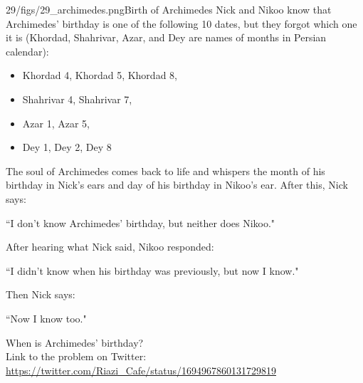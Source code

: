 \begin{problem}{29/figs/29_archimedes.png}{Birth of Archimedes}
	Nick and Nikoo know that Archimedes' birthday is one of the following 10 dates, but they forgot which one it is (Khordad, Shahrivar, Azar, and Dey are names of months in Persian calendar):

\begin{itemize}
\item  Khordad 4, Khordad 5, Khordad 8,
\item  Shahrivar 4, Shahrivar 7, 
\item Azar 1, Azar 5,
\item  Dey 1, Dey 2, Dey 8
\end{itemize}

The soul of Archimedes comes back to life and whispers the month of his birthday in Nick's ears and day of his birthday in Nikoo's ear. After this, Nick says: 
\begin{center}
``I don't know Archimedes' birthday, but neither does Nikoo."
\end{center}

After hearing what Nick said, Nikoo responded:

\begin{center}
	``I didn't know when his birthday was previously, but now I know."
\end{center}

Then Nick says:

\begin{center}
	``Now I know too."
\end{center}

When is Archimedes' birthday?\\[0.2cm]

Link to the problem on Twitter:  \url{https://twitter.com/Riazi_Cafe/status/1694967860131729819}\end{problem}